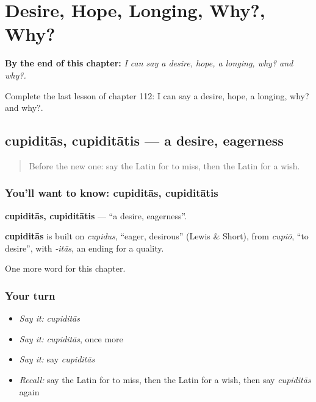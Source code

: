 
\chapter{Desire, Hope, Longing, Why?, Why?}
\label{ch:la-desire-hope-longing-why-why}

\begin{chapteropening}
\textbf{By the end of this chapter:} \emph{I can say a desire, hope, a longing, why? and why?.}

Complete the last lesson of chapter 112: I can say a desire, hope, a longing, why? and why?.
\end{chapteropening}

\section[cupiditās, cupiditātis]{cupiditās, cupiditātis — a desire, eagerness}

\label{lesson:LA-C112-cupiditas}



\begin{quote}
Before the new one: say the Latin for to miss, then the Latin for a wish.
\end{quote}

\subsection*{You'll want to know: cupiditās, cupiditātis}
\textbf{cupiditās, cupiditātis} — \textquotedblleft{}a desire, eagerness\textquotedblright{}.

\begin{cousinweb}
\textbf{cupiditās} is built on \emph{cupidus}, \textquotedblleft{}eager, desirous\textquotedblright{} (Lewis \& Short), from \emph{cupiō}, \textquotedblleft{}to desire\textquotedblright{}, with \emph{-itās}, an ending for a quality.
\end{cousinweb}

\begin{grammarlens}[title={What you've built}]
One more word for this chapter.
\end{grammarlens}

\subsection*{Your turn}
\begin{itemize}
\raggedright
  \item \emph{Say it:} \emph{cupiditās}
  \item \emph{Say it:} \emph{cupiditās}, once more
  \item \emph{Say it:} say \emph{cupiditās}
  \item \emph{Recall:} say the Latin for to miss, then the Latin for a wish, then say \emph{cupiditās} again
\end{itemize}

